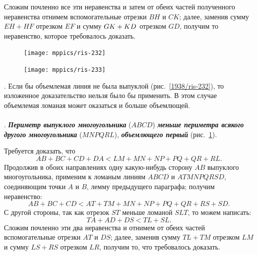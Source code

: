 \documentclass[twoside]{book}
\begin{document}
Сложим почленно все эти неравенства и затем от обеих частей полученного неравенства отнимем вспомогательные отрезки $BH$ и $CK$;
далее, заменив сумму $EH+HF$ отрезком $EF$ и сумму $GK\z+KD$ отрезком $GD$, получим то неравенство, которое требовалось доказать.

\begin{figure}[h!]
\begin{minipage}{.48\textwidth}
\centering
\texttt{[image: mppics/ris-232]}
\end{minipage}\hfill
\begin{minipage}{.48\textwidth}
\centering
\texttt{[image: mppics/ris-233]}
\end{minipage}

\medskip

\begin{minipage}{.48\textwidth}
\centering
\caption{}\label{1938/ris-232}
\end{minipage}\hfill
\begin{minipage}{.48\textwidth}
\centering
\caption{}\label{1938/ris-233}
\end{minipage}
\vskip-4mm
\end{figure}

\smallskip
\mbox{.}
Если бы объемлемая линия не была выпуклой (рис.~\ref{1938/ris-232}), то изложенное доказательство нельзя было бы применить.
В этом случае объемлемая ломаная может оказаться и больше объемлющей.

\paragraph{}\label{1938/233}
.
\textbf{\emph{Периметр выпуклого многоугольника}} ($ABCD$) \textbf{\emph{меньше периметра всякого другого многоугольника}} ($MNPQRL$), \textbf{\emph{объемлющего первый}} (рис.~\ref{1938/ris-233}).

Требуется доказать, что
\[AB+BC+CD+DA < LM+MN+NP+PQ+QR+RL.\]
Продолжив в обоих направлениях одну какую-нибудь сторону $AB$ выпуклого многоугольника, применим к ломаным линиям $ABCD$ и $ATMNPQRSD$, соединяющим точки $A$ и $B$, лемму предыдущего параграфа;
получим неравенство:
\[AB+BC+CD<AT+TM+MN+NP+PQ+QR+RS+SD.\]
С другой стороны, так как отрезок $ST$ меньше ломаной $SLT$, то можем написать:
\[TA+AD+DS<TL+SL.\]
Сложим почленно эти два неравенства и отнимем от обеих частей вспомогательные отрезки $AT$ и $DS$;
далее, заменив сумму $TL+TM$ отрезком $LM$ и сумму $LS+RS$ отрезком $LR$, получим то, что требовалось доказать.
\end{document}
